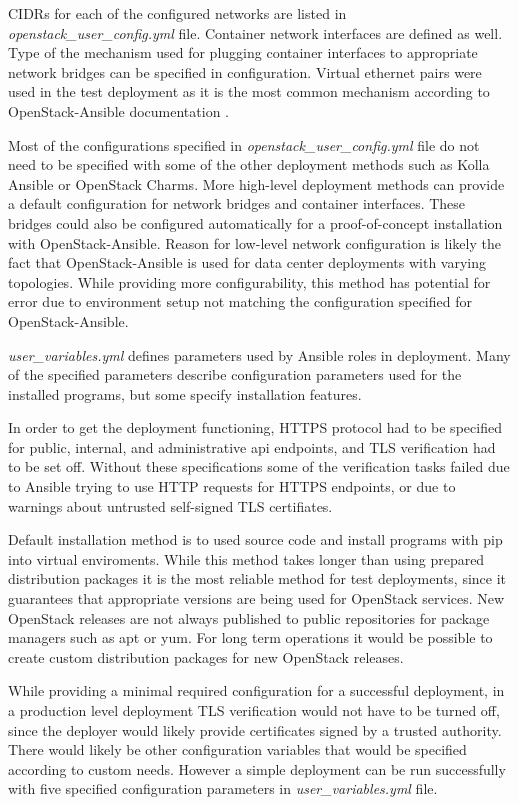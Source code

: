 CIDRs for each of the configured networks are listed in
\textit{openstack\_user\_config.yml} file. Container network interfaces are
defined as well. Type of the mechanism used for plugging container interfaces
to appropriate network bridges can be specified in configuration. Virtual
ethernet pairs were used in the test deployment as it is the most common
mechanism according to OpenStack-Ansible documentation
\cite{openstack-ansible}.

Most of the configurations specified in \textit{openstack\_user\_config.yml}
file do not need to be specified with some of the other deployment methods such
as Kolla Ansible or OpenStack Charms. More high-level deployment methods can
provide a default configuration for network bridges and container interfaces.
These bridges could also be configured automatically for a proof-of-concept
installation with OpenStack-Ansible. Reason for low-level network configuration
is likely the fact that OpenStack-Ansible is used for data center deployments
with varying topologies. While providing more configurability, this method has
potential for error due to environment setup not matching the configuration
specified for OpenStack-Ansible.

\textit{user\_variables.yml} defines parameters used by Ansible roles in
deployment. Many of the specified parameters describe configuration parameters
used for the installed programs, but some specify installation features.

In order to get the deployment functioning, HTTPS protocol had to be specified
for public, internal, and administrative api endpoints, and TLS verification
had to be set off. Without these specifications some of the verification tasks
failed due to Ansible trying to use HTTP requests for HTTPS endpoints, or due
to warnings about untrusted self-signed TLS certifiates.

Default installation method is to used source code and install programs with
pip into virtual enviroments. While this method takes longer than using
prepared distribution packages it is the most reliable method for test
deployments, since it guarantees that appropriate versions are being used for
OpenStack services. New OpenStack releases are not always published to public
repositories for package managers such as apt or yum. For long term operations
it would be possible to create custom distribution packages for new OpenStack
releases.

While providing a minimal required configuration for a successful deployment,
in a production level deployment TLS verification would not have to be turned
off, since the deployer would likely provide certificates signed by a trusted
authority. There would likely be other configuration variables that would be
specified according to custom needs. However a simple deployment can be run
successfully with five specified configuration parameters in
\textit{user\_variables.yml} file.

